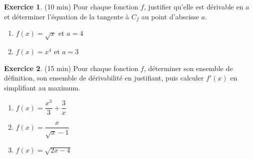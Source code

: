 \documentclass{exam}
\theoremstyle{definition}
\newtheorem{exercice}{Exercice}
\begin{document}
\begin{exercice}{(10 min)}
    Pour chaque fonction $f$, justifier qu’elle est dérivable en $a$ et déterminer l’équation de la tangente à $C_f$ au point d’abscisse $a$.
    \begin{enumerate}
        \item $f(x) = \sqrt{x}$ et $a = 4$
        \item $f(x) = x^4$ et $a = 3$
    \end{enumerate}
    \end{exercice}
    
    \begin{exercice}{(15 min)}
    Pour chaque fonction $f$, déterminer son ensemble de définition, son ensemble de dérivabilité en justifiant, puis calculer $f'(x)$ en simplifiant au maximum.
    \begin{enumerate}
        \item $f(x) = \dfrac{x^3}{3} + \dfrac{3}{x}$
        \item $f(x) = \dfrac{x}{\sqrt{x} - 1}$
        \item $f(x) = \sqrt{2x - 4}$
    \end{enumerate}
    \end{exercice}
    
\end{document}
